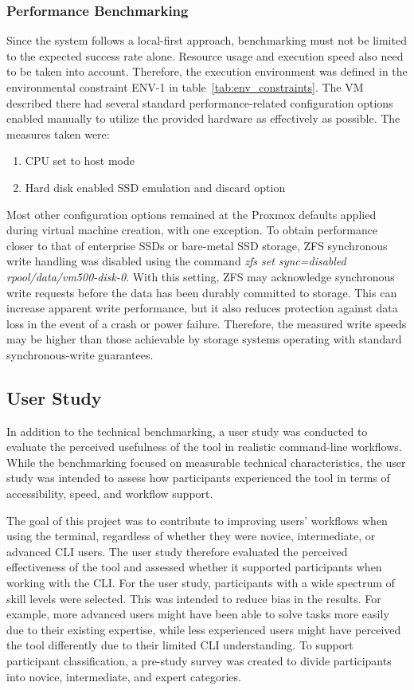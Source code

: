 \subsubsection{Performance Benchmarking}\label{sec:performance_bench}
Since the system follows a local-first approach, benchmarking must not be limited to the expected success rate alone. Resource usage and execution speed also need to be taken into account. Therefore, the execution environment was defined in the environmental constraint ENV-1 in table~\ref{tab:env_constraints}. The \ac{VM} described there had several standard performance-related configuration options enabled manually to utilize the provided hardware as effectively as possible. The measures taken were:

\begin{enumerate}
	\item CPU set to host mode
	\item Hard disk enabled SSD emulation and discard option
\end{enumerate}

Most other configuration options remained at the Proxmox defaults applied during virtual machine creation, with one exception. To obtain performance closer to that of enterprise SSDs or bare-metal SSD storage, ZFS synchronous write handling was disabled using the command \textit{zfs set sync=disabled rpool/data/vm500-disk-0}. With this setting, ZFS may acknowledge synchronous write requests before the data has been durably committed to storage. This can increase apparent write performance, but it also reduces protection against data loss in the event of a crash or power failure. Therefore, the measured write speeds may be higher than those achievable by storage systems operating with standard synchronous-write guarantees.

\subsection{User Study}
In addition to the technical benchmarking, a user study was conducted to evaluate the perceived usefulness of the tool in realistic command-line workflows. While the benchmarking focused on measurable technical characteristics, the user study was intended to assess how participants experienced the tool in terms of accessibility, speed, and workflow support.

The goal of this project was to contribute to improving users' workflows when using the terminal, regardless of whether they were novice, intermediate, or advanced CLI users. The user study therefore evaluated the perceived effectiveness of the tool and assessed whether it supported participants when working with the CLI.
For the user study, participants with a wide spectrum of skill levels were selected. This was intended to reduce bias in the results. For example, more advanced users might have been able to solve tasks more easily due to their existing expertise, while less experienced users might have perceived the tool differently due to their limited CLI understanding. To support participant classification, a pre-study survey was created to divide participants into novice, intermediate, and expert categories.


